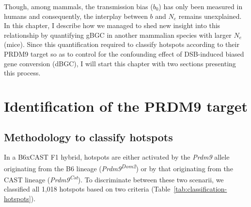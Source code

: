 Though, among mammals, the transmission bias ($b_0$) has only been measured in humans \citep{williams2015noncrossover, halldorsson2016rate} and consequently, the interplay between $b$ and $N_e$ remains unexplained.
In this chapter, I describe how we managed to shed new insight into this relationship by quantifying gBGC in another mammalian species with larger $N_e$ (mice).
Since this quantification required to classify hotspots according to their PRDM9 target so as to control for the confounding effect of DSB-induced biased gene conversion (dBGC), I will start this chapter with two sections presenting this process.




\section{Identification of the PRDM9 target}
\subsection{Methodology to classify hotspots}
\label{chap7:PRDM9-target-inference}

In a B6xCAST F1 hybrid, hotspots are either activated by the \textit{Prdm9} allele originating from the B6 lineage (\textit{Prdm9\textsuperscript{Dom2}}) or by that originating from the CAST lineage (\textit{Prdm9\textsuperscript{Cst}}).
To discriminate between these two scenarii, we classified all 1,018 hotspots based on two criteria (Table~\ref{tab:classification-hotspots}).

